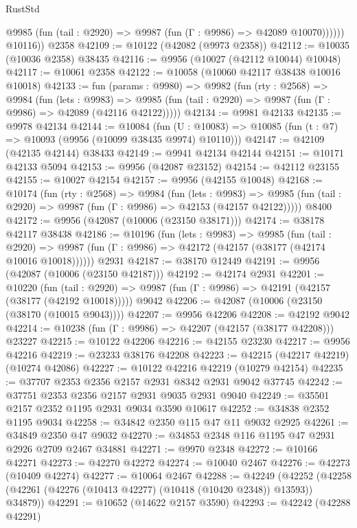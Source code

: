 \begin{lexlean}{RustStd}
\begin{coremodule}
              @9985 (fun (tail : @2920) => @9987 (fun (Γ : @9986) => @42089 @10070))))))
        @10116))
    @2358
@42109 := @10122 (@42082 (@9973 @2358))
@42112 := @10035 (@10036 @2358) @38435
@42116 := @9956 (@10027 (@42112 @10044) @10048)
@42117 := @10061 @2358
@42122 := @10058 (@10060 @42117 @38438 @10016 @10018)
@42133 := fun (params : @9980) =>
  @9982
    (fun (rty : @2568) =>
    @9984
      (fun (lets : @9983) =>
      @9985 (fun (tail : @2920) => @9987 (fun (Γ : @9986) => @42089 (@42116 @42122)))))
@42134 := @9981 @42133
@42135 := @9978 @42134
@42144 := @10084
    (fun (U : @10083) => @10085 (fun (t : @7) => @10093 (@9956 (@10099 @38435 @9974) @10110)))
@42147 := @42109 (@42135 @42144) @38433
@42149 := @9941 @42134 @42144
@42151 := @10171 @42133 @5094
@42153 := @9956 (@42087 @23152)
@42154 := @42112 @23155
@42155 := @10027 @42154
@42157 := @9956 (@42155 @10048)
@42168 := @10174
    (fun (rty : @2568) =>
    @9984
      (fun (lets : @9983) =>
      @9985 (fun (tail : @2920) => @9987 (fun (Γ : @9986) => @42153 (@42157 @42122)))))
    @8400
@42172 := @9956 (@42087 (@10006 (@23150 @38171)))
@42174 := @38178 @42117 @38438
@42186 := @10196
    (fun (lets : @9983) =>
    @9985
      (fun (tail : @2920) =>
      @9987 (fun (Γ : @9986) => @42172 (@42157 (@38177 (@42174 @10016 @10018))))))
    @2931
@42187 := @38170 @12449
@42191 := @9956 (@42087 (@10006 (@23150 @42187)))
@42192 := @42174 @2931
@42201 := @10220
    (fun (tail : @2920) => @9987 (fun (Γ : @9986) => @42191 (@42157 (@38177 (@42192 @10018)))))
    @9042
@42206 := @42087 (@10006 (@23150 (@38170 (@10015 @9043))))
@42207 := @9956 @42206
@42208 := @42192 @9042
@42214 := @10238 (fun (Γ : @9986) => @42207 (@42157 (@38177 @42208))) @23227
@42215 := @10122 @42206
@42216 := @42155 @23230
@42217 := @9956 @42216
@42219 := @23233 @38176 @42208
@42223 := @42215 (@42217 @42219) (@10274 @42086)
@42227 := @10122 @42216 @42219 (@10279 @42154)
@42235 := @37707 @2353 @2356 @2157 @2931 @8342 @2931 @9042 @37745
@42242 := @37751 @2353 @2356 @2157 @2931 @9035 @2931 @9040
@42249 := @35501 @2157 @2352 @1195 @2931 @9034 @3590 @10617
@42252 := @34838 @2352 @1195 @9034
@42258 := @34842 @2350 @115 @47 @11 @9032 @2925
@42261 := @34849 @2350 @47 @9032
@42270 := @34853 @2348 @116 @1195 @47 @2931 @2926 @2709 @2467 @34881
@42271 := @9970 @2348
@42272 := @10166 @42271
@42273 := @42270 @42272
@42274 := @10040 @2467
@42276 := @42273 (@10409 @42274)
@42277 := @10064 @2467
@42288 := @42249
    (@42252 (@42258 (@42261 (@42276 (@10413 @42277) (@10418 (@10420 @2348)) @13593)) @34879))
@42291 := @10652 (@14622 @2157 @3590)
@42293 := @42242 (@42288 @42291)

\end{coremodule}
\end{lexlean}
